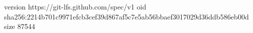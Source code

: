 version https://git-lfs.github.com/spec/v1
oid sha256:2214b701c9971efcb3cef39d867af5c7e5ab56bbaef3017029d36ddb586eb00d
size 87544
